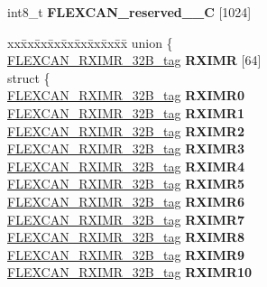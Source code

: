 \begin{DoxyCompactItemize}
\begin{tabbing}
\end{tabbing}\item 
\mbox{\label{structFLEXCAN__struct__tag_a3dee391164ea54dd0b6e7acd15e5ba7f}} 
int8\+\_\+t {\bfseries F\+L\+E\+X\+C\+A\+N\+\_\+reserved\+\_\+\_\+C} \mbox{[}1024\mbox{]}
\item 
\mbox{\label{structFLEXCAN__struct__tag_a11ef8df17d4f985c221a9db9685b3919}} 
\begin{tabbing}
xx\=xx\=xx\=xx\=xx\=xx\=xx\=xx\=xx\=\kill
union \{\\
\>\mbox{\hyperlink{unionFLEXCAN__RXIMR__32B__tag}{FLEXCAN\_RXIMR\_32B\_tag}} {\bfseries RXIMR} \mbox{[}64\mbox{]}\\
\mbox{\label{unionFLEXCAN__struct__tag_1_1_0D2360_a84c5f340c5b2365d3f5f384baf15908a}} 
\>struct \{\\
\>\>\mbox{\hyperlink{unionFLEXCAN__RXIMR__32B__tag}{FLEXCAN\_RXIMR\_32B\_tag}} {\bfseries RXIMR0}\\
\>\>\mbox{\hyperlink{unionFLEXCAN__RXIMR__32B__tag}{FLEXCAN\_RXIMR\_32B\_tag}} {\bfseries RXIMR1}\\
\>\>\mbox{\hyperlink{unionFLEXCAN__RXIMR__32B__tag}{FLEXCAN\_RXIMR\_32B\_tag}} {\bfseries RXIMR2}\\
\>\>\mbox{\hyperlink{unionFLEXCAN__RXIMR__32B__tag}{FLEXCAN\_RXIMR\_32B\_tag}} {\bfseries RXIMR3}\\
\>\>\mbox{\hyperlink{unionFLEXCAN__RXIMR__32B__tag}{FLEXCAN\_RXIMR\_32B\_tag}} {\bfseries RXIMR4}\\
\>\>\mbox{\hyperlink{unionFLEXCAN__RXIMR__32B__tag}{FLEXCAN\_RXIMR\_32B\_tag}} {\bfseries RXIMR5}\\
\>\>\mbox{\hyperlink{unionFLEXCAN__RXIMR__32B__tag}{FLEXCAN\_RXIMR\_32B\_tag}} {\bfseries RXIMR6}\\
\>\>\mbox{\hyperlink{unionFLEXCAN__RXIMR__32B__tag}{FLEXCAN\_RXIMR\_32B\_tag}} {\bfseries RXIMR7}\\
\>\>\mbox{\hyperlink{unionFLEXCAN__RXIMR__32B__tag}{FLEXCAN\_RXIMR\_32B\_tag}} {\bfseries RXIMR8}\\
\>\>\mbox{\hyperlink{unionFLEXCAN__RXIMR__32B__tag}{FLEXCAN\_RXIMR\_32B\_tag}} {\bfseries RXIMR9}\\
\>\>\mbox{\hyperlink{unionFLEXCAN__RXIMR__32B__tag}{FLEXCAN\_RXIMR\_32B\_tag}} {\bfseries RXIMR10}\\

\end{tabbing}
\end{DoxyCompactItemize}
